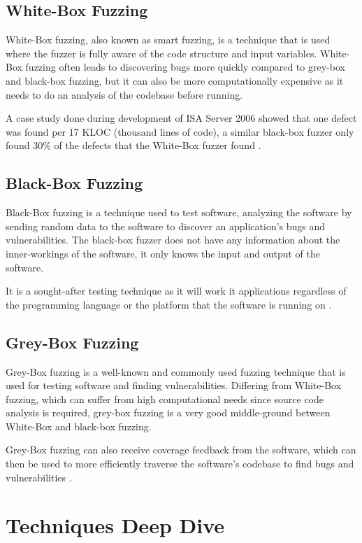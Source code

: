 \documentclass[a4paper,12pt]{article}
\begin{document}
\subsection{White-Box Fuzzing}
White-Box fuzzing, also known as smart fuzzing, is a technique that is used where the fuzzer is fully aware of the code structure and input variables. White-Box fuzzing often leads to discovering bugs more quickly compared to grey-box and black-box fuzzing, but it can also be more computationally expensive as it needs to do an analysis of the codebase before running. 

A case study done during development of ISA Server 2006 showed that one defect was found per 17 KLOC (thousand lines of code), a similar black-box fuzzer only found 30\% of the defects that the White-Box fuzzer found \cite{neystadt2009}.

\subsection{Black-Box Fuzzing}
Black-Box fuzzing is a technique used to test software, analyzing the software by sending random data to the software to discover an application's bugs and vulnerabilities. The black-box fuzzer does not have any information about the inner-workings of the software, it only knows the input and output of the software.


It is a sought-after testing technique as it will work it applications regardless of the programming language or the platform that the software is running on \cite{ALSAEDI202210068}.

\subsection{Grey-Box Fuzzing}
Grey-Box fuzzing is a well-known and commonly used fuzzing technique that is used for testing software and finding vulnerabilities. Differing from White-Box fuzzing, which can suffer from high computational needs since source code analysis is required, grey-box fuzzing is a very good middle-ground between White-Box and black-box fuzzing.\cite{8839290} 

Grey-Box fuzzing can also receive coverage feedback from the software, which can then be used to more efficiently traverse the software's codebase to find bugs and vulnerabilities  \cite{Blackwell2024-ao}.

\section{Techniques Deep Dive}
\end{document}
